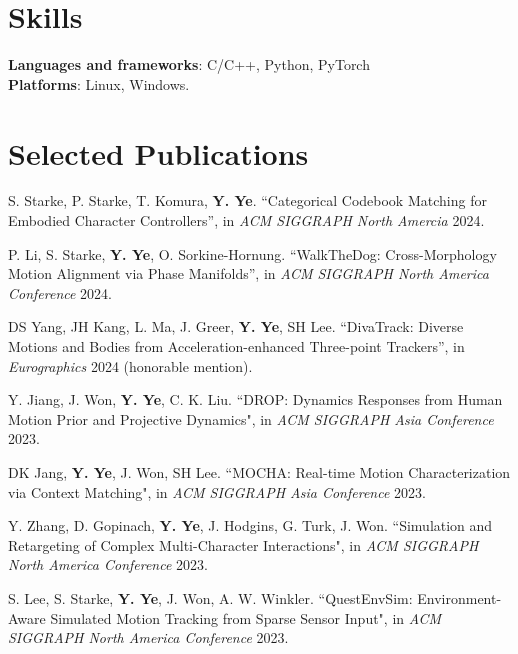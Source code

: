 \documentclass[margin,line]{res}
\begin{document}
\begin{resume}
\section{\sc Skills}
{\bf Languages and frameworks}: C/C++, Python, PyTorch\\
{\bf Platforms}: Linux, Windows. 


\section{\sc Selected Publications}

S. Starke, P. Starke, T. Komura, {\bf Y. Ye}. ``Categorical Codebook Matching for Embodied Character Controllers'', in {\em ACM SIGGRAPH North Amercia} 2024.

\vspace*{-.1in}
P. Li, S. Starke, {\bf Y. Ye}, O. Sorkine-Hornung. ``WalkTheDog: Cross-Morphology Motion Alignment via Phase Manifolds'', in {\em ACM SIGGRAPH North America Conference} 2024.

\vspace*{-.1in}
DS Yang, JH Kang, L. Ma, J. Greer, {\bf Y. Ye}, SH Lee. ``DivaTrack: Diverse Motions and Bodies from Acceleration-enhanced Three-point Trackers'', in {\em Eurographics} 2024 (honorable mention). 

\vspace*{-.1in}
Y. Jiang, J. Won, {\bf Y. Ye}, C. K. Liu. ``DROP: Dynamics Responses from Human Motion Prior and Projective Dynamics", in {\em ACM SIGGRAPH Asia Conference} 2023.

\vspace*{-.1in}
DK Jang, {\bf Y. Ye}, J. Won, SH Lee. ``MOCHA: Real-time Motion Characterization via Context Matching", in {\em ACM SIGGRAPH Asia Conference} 2023.

\vspace*{-.1in}
Y. Zhang, D. Gopinach, {\bf Y. Ye}, J. Hodgins, G. Turk, J. Won. ``Simulation and Retargeting of Complex Multi-Character Interactions", in {\em ACM SIGGRAPH North America Conference} 2023.

\vspace*{-.1in}
S. Lee, S. Starke, {\bf Y. Ye}, J. Won, A. W. Winkler. ``QuestEnvSim: Environment-Aware Simulated Motion Tracking from Sparse Sensor Input", in {\em ACM SIGGRAPH North America Conference} 2023.


\end{resume}
\end{document}
